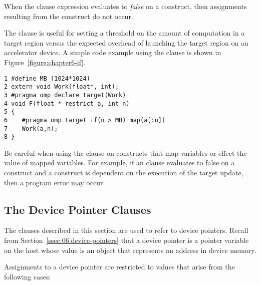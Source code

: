 When the  clause expression evaluates to \emph{false} on a
 construct, then assignments resulting from the construct
do not occur.

The 
clause is useful for setting a threshold on the amount of computation in a
target region versus the expected overhead of launching the target region on an
accelerator device.  A simple code example using the  clause is shown
in Figure~\ref{figure:chapter6-if}.

\begin{figure*}[!tb]
\begin{verbatim}
1 #define MB (1024*1024)
2 extern void Work(float*, int);
3 #pragma omp declare target(Work)
4 void F(float * restrict a, int n)
5 {
6    #pragma omp target if(n > MB) map(a[:n])
7    Work(a,n);
8 }
\end{verbatim}
\caption{ \textbf {Example of an if clause on the target construct} -- \small
          If \texttt{n} is greater than a threshold, execute the target region on the
          default accelerator.  Otherwise, execute the region on the host device.
         }
\label{figure:chapter6-if}
\end{figure*}

Be careful when using the  clause on constructs that
map variables or effect the value of mapped variables.  
For example, if an  clause evaluates to false on a
 construct and a  construct is dependent on
the execution of the target update, then a program error may occur.

\subsection{The Device Pointer Clauses}
\label{sec:06.Device-pointer-clauses}

The clauses described in this section are used to refer to device pointers.
Recall from Section~\ref{ssec:06.device-pointers} that a device pointer is a
pointer variable on the host whose value is an object that represents an
address in device memory.

Assignments to a device pointer are restricted to values that arise
from the following cases:

